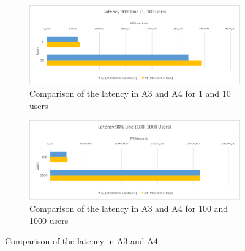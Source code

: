 \documentclass[a4paper,oneside]{bth}
\begin{document}
\begin{figure}[h]
\begin{center}

\begin{subfigure}[b]{1\textwidth}
\includegraphics[width=13cm]{Graph/rq2-latency-1}
\caption{Comparison of the latency in A3 and A4 for 1 and 10 users}
\end{subfigure}

\begin{subfigure}[b]{1\textwidth}
\includegraphics[width=13cm]{Graph/rq2-latency-2}
\caption{Comparison of the latency in A3 and A4 for 100 and 1000 users}
\end{subfigure}

\caption{Comparison of the latency in A3 and A4}
\label{rq2-latency}

\end{center}
\end{figure}
\end{document}
